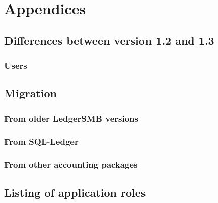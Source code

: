 


\part{Appendices}
\appendix

\chapter{Differences between version 1.2 and 1.3}

\section{Users}
\label{sec:DifferencesUsers}

\chapter{Migration}

\section{From older LedgerSMB versions}

\section{From SQL-Ledger}

\section{From other accounting packages}




\chapter{Listing of application roles}
\label{cha:RolesListing}

